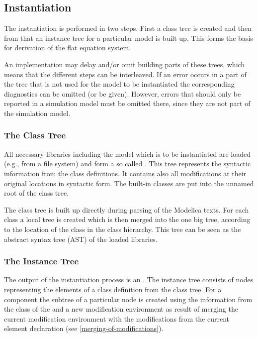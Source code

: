 \subsection{Instantiation}\label{instantiation}

The instantiation is performed in two steps.
First a class tree is created and then from that an instance tree for a particular model is built up.
This forms the basis for derivation of the flat equation system.

An implementation may delay and/or omit building parts of these trees, which means that the different steps can be interleaved.
If an error occurs in a part of the tree that is not used for the model to be instantiated the corresponding diagnostics can be omitted (or be given).
However, errors that should only be reported in a simulation model must be omitted there, since they are not part of the simulation model.


\subsubsection{The Class Tree}\label{the-class-tree}

All necessary libraries including the model which is to be instantiated are loaded (e.g., from a file system) and form a so called .
This tree represents the syntactic information from the class definitions.
It contains also all modifications at their original locations in syntactic form.
The built-in classes are put into the unnamed root of the class tree.

\begin{nonnormative}
The class tree is built up directly during parsing of the Modelica texts.
For each class a local tree is created which is then merged into the one big tree, according to the location of the class in the class hierarchy.
This tree can be seen as the abstract syntax tree (AST) of the loaded libraries.
\end{nonnormative}


\subsubsection{The Instance Tree}\label{the-instance-tree}

The output of the instantiation process is an .
The instance tree consists of nodes representing the elements of a class definition from the class tree.
For a component the subtree of a particular node is created using the information from the class of the  and a new modification environment as result of merging the current modification environment with the modifications from the current element declaration (see \cref{merging-of-modifications}).


